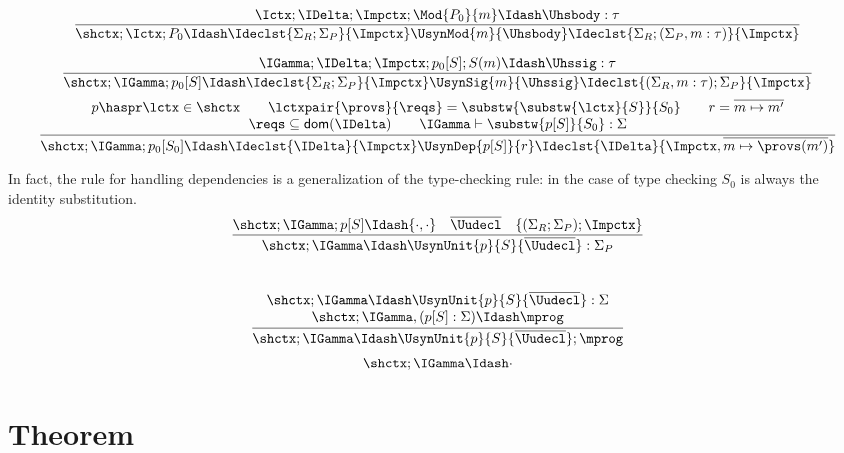\[
\frac{
\Ictx; \IDelta; \Impctx; \Mod{P_0}{m} \Idash \Uhsbody : \tau
}{
\shctx; \Ictx; P_0 \Idash \Ideclst{\Sigma_R; \Sigma_P}{\Impctx} \UsynMod{m}{\Uhsbody} \Ideclst{\Sigma_R; (\Sigma_P, m : \tau)}{\Impctx}
}
\]
\begin{greybox}
\[%
\frac{
\IGamma; \IDelta; \Impctx; p_0[S]; S(m) \Idash \Uhssig : \tau
}{
\shctx; \IGamma; p_0[S] \Idash \Ideclst{\Sigma_R; \Sigma_P}{\Impctx} \UsynSig{m}{\Uhssig} \Ideclst{(\Sigma_R, m : \tau); \Sigma_P}{\Impctx}
}
\]
\[
\frac{
\begin{array}{c}
p \haspr \lctx \in \shctx \qquad
\lctxpair{\provs}{\reqs} = \substw{\substw{\lctx}{S}}{S_0} \qquad
r = \overline{m \mapsto m'} \\
\reqs \subseteq \textsf{dom}(\IDelta) \qquad
\IGamma \vdash \substw{p[S]}{S_0} : \Sigma
\end{array}
}{
\shctx; \IGamma; p_0[S_0] \Idash \Ideclst{\IDelta}{\Impctx} \UsynDep{p[S]}{r} \Ideclst{\IDelta}{\Impctx,  \overline{m \mapsto \provs(m')}}
}
\]
\end{greybox}

In fact, the rule for handling dependencies is a generalization
of the type-checking rule: in the case of type checking $S_0$ is
always the identity substitution.\\

\fbox{$\shctx; \IGamma \Idash \Uunit : \Sigma$}
\[
\frac{
\shctx; \IGamma; p[S] \Idash \{ \cdot, \cdot \} \quad \overline{\Uudecl} \quad \{ (\Sigma_R; \Sigma_P) ; \Impctx \}
}{
\begin{array}{l}
\shctx; \IGamma \Idash \UsynUnit{p}{S}{\overline{\Uudecl}} : \Sigma_P
\end{array}
}
\]\\

\fbox{$\shctx; \IGamma \Idash \mprog$}
\[
\frac{
\begin{array}{c}
\shctx; \IGamma \Idash \UsynUnit{p}{S}{\overline{\Uudecl}} : \Sigma \\
\shctx; \IGamma, (p[S] : \Sigma) \Idash \mprog \\
\end{array}
}{
\shctx; \IGamma \Idash \UsynUnit{p}{S}{\overline{\Uudecl}}; \mprog
}
\]
\[
\shctx; \IGamma \Idash \cdot
\]

\section{Theorem}

